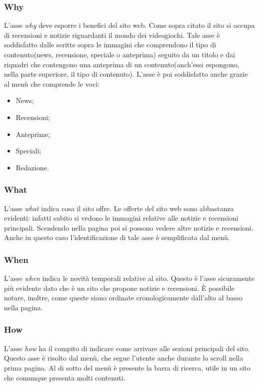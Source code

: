 \documentclass[../ProgettoTecWeb2.tex]{subfiles}
\begin{document}
		\subsubsection{Why}
			L'asse \textit{why} deve esporre i benefici del sito web. Come sopra citato il sito si occupa di recensioni e notizie riguardanti il mondo dei videogiochi. Tale asse è soddisfatto dalle scritte sopra le immagini che comprendono il tipo di contenuto(news, recensione, speciale o anteprima) seguito da un titolo e dai riquadri che contengono una anteprima di un contenuto(anch'essi espongono, nella parte superiore, il tipo di contenuto). L'asse è poi soddisfatto anche grazie al menù che comprende le voci:
			\begin{itemize}
				\item News;
				\item Recensioni;
				\item Anteprime;
				\item Speciali;
				\item Redazione.
			\end{itemize}
		\subsubsection{What}
			L'asse \textit{what} indica cosa il sito offre. Le offerte del sito web sono abbastanza evidenti: infatti subito si vedono le immagini relative alle notizie e recensioni principali. Scendendo nella pagina poi si possono vedere altre notizie e recensioni. Anche in questo caso l'identificazione di tale asse è semplificata dal menù.
		\subsubsection{When}
			L'asse \textit{when} indica le novità temporali relative al sito. Questo è l'asse sicuramente più evidente dato che è un sito che propone notizie e recensioni. È possibile notare, inoltre, come queste siano ordinate cronologicamente dall'alto al basso nella pagina.
		\subsubsection{How}
			L'asse \textit{how} ha il compito di indicare come arrivare alle sezioni principali del sito. Questo asse è risolto dal menù, che segue l'utente anche durante lo scroll nella prima pagina. Al di sotto del menù è presente la barra di ricerca, utile in un sito che comunque presenta molti contenuti.
			
\end{document}
